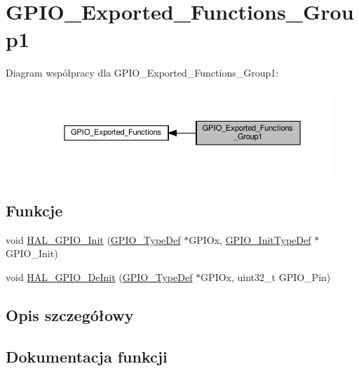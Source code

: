 \hypertarget{group___g_p_i_o___exported___functions___group1}{}\section{G\+P\+I\+O\+\_\+\+Exported\+\_\+\+Functions\+\_\+\+Group1}
\label{group___g_p_i_o___exported___functions___group1}
Diagram współpracy dla G\+P\+I\+O\+\_\+\+Exported\+\_\+\+Functions\+\_\+\+Group1\+:\nopagebreak
\begin{figure}[H]
\begin{center}
\leavevmode
\includegraphics[width=350pt]{group___g_p_i_o___exported___functions___group1}
\end{center}
\end{figure}
\subsection*{Funkcje}
\begin{DoxyCompactItemize}
\item 
void \hyperlink{group___g_p_i_o___exported___functions___group1_ga41bda93b6dd639e4905fdb1454eff98e}{H\+A\+L\+\_\+\+G\+P\+I\+O\+\_\+\+Init} (\hyperlink{struct_g_p_i_o___type_def}{G\+P\+I\+O\+\_\+\+Type\+Def} $\ast$G\+P\+I\+Ox, \hyperlink{struct_g_p_i_o___init_type_def}{G\+P\+I\+O\+\_\+\+Init\+Type\+Def} $\ast$G\+P\+I\+O\+\_\+\+Init)
\item 
void \hyperlink{group___g_p_i_o___exported___functions___group1_gafe9c756b5aa18961032a3f8aa572959b}{H\+A\+L\+\_\+\+G\+P\+I\+O\+\_\+\+De\+Init} (\hyperlink{struct_g_p_i_o___type_def}{G\+P\+I\+O\+\_\+\+Type\+Def} $\ast$G\+P\+I\+Ox, uint32\+\_\+t G\+P\+I\+O\+\_\+\+Pin)
\end{DoxyCompactItemize}


\subsection{Opis szczegółowy}


\subsection{Dokumentacja funkcji}
\mbox{\label{group___g_p_i_o___exported___functions___group1_gafe9c756b5aa18961032a3f8aa572959b}} 
